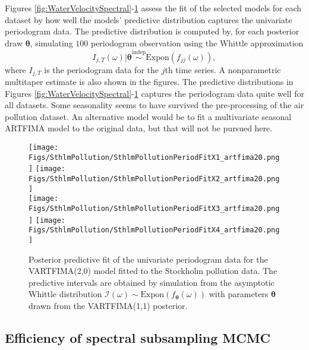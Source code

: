 \documentclass[11pt,english,oneside]{amsart}
\numberwithin{equation}{section}
\theoremstyle{plain}
\numberwithin{equation}{section}
\renewcommand{\v}[1]{\boldsymbol{#1}}
\begin{document}
Figures \ref{fig:WaterVelocitySpectral}-\ref{fig:SthlmPollutionSpectral} assess the fit of the selected models for each dataset by how well the models' predictive distribution captures the univariate periodogram data. The predictive distribution is computed by, for each posterior draw $\v \theta$, simulating $100$ periodogram observation using the Whittle approximation
\begin{equation*}
I_{j,T}(\omega) \vert \v \theta \overset{\mathrm{indep}}{\sim} \mathrm{Expon}(f_{jj}(\omega)),
\end{equation*}
where $I_{j,T}$ is the periodogram data for the $j$th time series. A nonparametric multitaper estimate \citep{barbour2014psd} is also shown in the figures. The predictive distributions in Figures \ref{fig:WaterVelocitySpectral}-\ref{fig:SthlmPollutionSpectral} captures the periodogram data quite well for all datasets. Some seasonality seems to have survived the pre-processing of the air pollution dataset. An alternative model would be to fit a multivariate seasonal ARTFIMA model to the original data, but that will not be pursued here.

\begin{figure}
    \texttt{[image: Figs/SthlmPollution/SthlmPollutionPeriodFitX1\_artfima20.png]}
    \texttt{[image: Figs/SthlmPollution/SthlmPollutionPeriodFitX2\_artfima20.png]} \\ 
    \texttt{[image: Figs/SthlmPollution/SthlmPollutionPeriodFitX3\_artfima20.png]}
    \texttt{[image: Figs/SthlmPollution/SthlmPollutionPeriodFitX4\_artfima20.png]}
    \caption{Posterior predictive fit of the univariate periodogram data for the VARTFIMA(2,0) model fitted to the Stockholm pollution data. The predictive intervals are obtained by simulation from the asymptotic Whittle distribution $\mathcal{I}(\omega)\sim\mathrm{Expon}(f_{\v\theta}(\omega))$ with parameters $\v\theta$ drawn from the VARTFIMA(1,1) posterior.}\label{fig:SthlmPollutionSpectral}
\end{figure}


\subsection{Efficiency of spectral subsampling MCMC}
\end{document}
